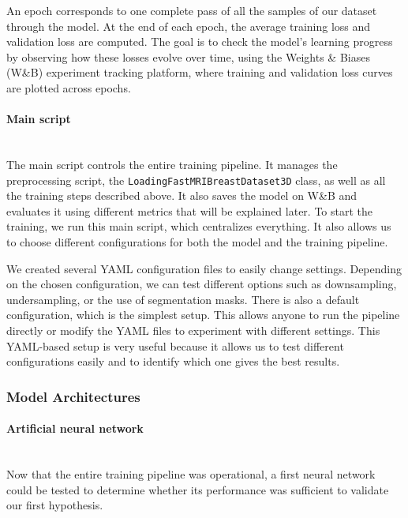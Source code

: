 \documentclass[12pt]{article}
\begin{document}
An epoch corresponds to one complete pass of all the samples of our dataset through the model. At the end of each epoch, the average training loss and validation loss are computed.
The goal is to check the model's learning progress by observing how these losses evolve over time, using the Weights \& Biases (W\&B) experiment tracking platform, where training and
validation loss curves are plotted across epochs.


\paragraph{Main script}
\mbox{}\\

The main script controls the entire training pipeline. It manages the preprocessing script, the \texttt{LoadingFastMRIBreastDataset3D} class, as well as all the training steps described above.
It also saves the model on W\&B and evaluates it using different metrics that will be explained later. To start the training, we run this main script,
which centralizes everything. It also allows us to choose different configurations for both the model and the training pipeline.
\vspace{0.5cm}

We created several YAML configuration files to easily change settings. 
Depending on the chosen configuration, we can test different options such as downsampling, undersampling, or the use of segmentation masks. 
There is also a default configuration, which is the simplest setup. 
This allows anyone to run the pipeline directly or modify the YAML files to experiment with different settings. 
This YAML-based setup is very useful because it allows us to test different configurations easily and to identify which one gives the best results.


\subsubsection{Model Architectures}
\paragraph{Artificial neural network}
\mbox{}\\

Now that the entire training pipeline was operational, a first neural network could be tested to determine whether its performance was sufficient to validate our first hypothesis.
\vspace{0.5cm}
\end{document}
